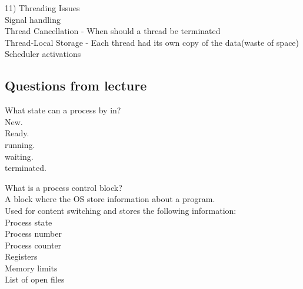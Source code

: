 \documentclass[a4paper,10pt,titlepage]{report}
\begin{document}
11) Threading Issues \\
\hspace{10mm} Signal handling \\
\hspace{10mm} Thread Cancellation - When should a thread be terminated \\
\hspace{10mm} Thread-Local Storage - Each thread had its own copy of the data(waste of space)\\
\hspace{10mm} Scheduler activations \\
\vspace{5mm}





\newpage
\subsection{Questions from lecture}
What state can a process by in?\\
\hspace{10mm}New.\\
\hspace{10mm}Ready.\\
\hspace{10mm}running.\\
\hspace{10mm}waiting.\\
\hspace{10mm}terminated.\\
\vspace{5mm}




What is a process control block?\\
\hspace{10mm}A block where the OS store information about a program.\\ 
\hspace{10mm}Used for content switching and stores the following information:\\
\hspace{20mm}Process state\\
\hspace{20mm}Process number\\
\hspace{20mm}Process counter\\
\hspace{20mm}Registers\\
\hspace{20mm}Memory limits\\
\hspace{20mm}List of open files\\
\end{document}
